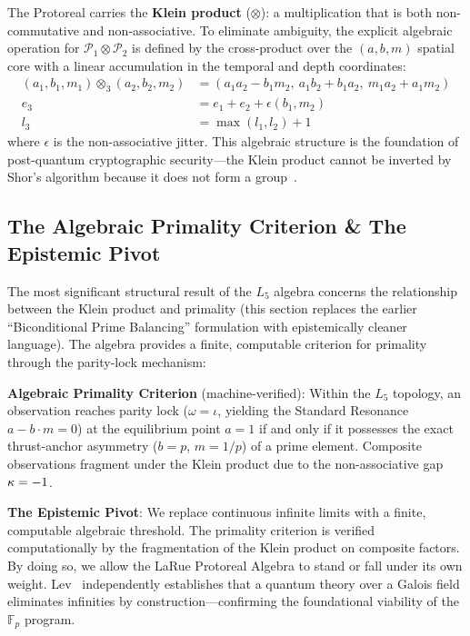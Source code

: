 The Protoreal carries the \textbf{Klein product} ($\otimes$): a multiplication that is both non-commutative and non-associative. To eliminate ambiguity, the explicit algebraic operation for $\mathcal{P}_1 \otimes \mathcal{P}_2$ is defined by the cross-product over the $(a, b, m)$ spatial core with a linear accumulation in the temporal and depth coordinates:
\begin{align}
    (a_1, b_1, m_1) \otimes_3 (a_2, b_2, m_2) &= (a_1 a_2 - b_1 m_2, \ a_1 b_2 + b_1 a_2, \ m_1 a_2 + a_1 m_2) \\
    e_3 &= e_1 + e_2 + \epsilon(b_1, m_2) \\
    l_3 &= \max(l_1, l_2) + 1
\end{align}
where $\epsilon$ is the non-associative jitter. This algebraic structure is the foundation of post-quantum cryptographic security---the Klein product cannot be inverted by Shor's algorithm because it does not form a group~\cite{Aingel}.

\subsection{The Algebraic Primality Criterion \& The Epistemic Pivot}

The most significant structural result of the $L_5$ algebra concerns the relationship between the Klein product and primality (this section replaces the earlier ``Biconditional Prime Balancing'' formulation with epistemically cleaner language). The algebra provides a finite, computable criterion for primality through the parity-lock mechanism:

\textbf{Algebraic Primality Criterion} (machine-verified): Within the $L_5$ topology, an observation reaches parity lock ($\omega = \iota$, yielding the Standard Resonance $a - b \cdot m = 0$) at the equilibrium point $a = 1$ if and only if it possesses the exact thrust-anchor asymmetry ($b = p$, $m = 1/p$) of a prime element. Composite observations fragment under the Klein product due to the non-associative gap $\kappa = -1$.

\textbf{The Epistemic Pivot}: We replace continuous infinite limits with a finite, computable algebraic threshold. The primality criterion is verified computationally by the fragmentation of the Klein product on composite factors. By doing so, we allow the LaRue Protoreal Algebra to stand or fall under its own weight. Lev~\cite{Lev2010} independently establishes that a quantum theory over a Galois field eliminates infinities by construction---confirming the foundational viability of the $\mathbb{F}_p$ program.

